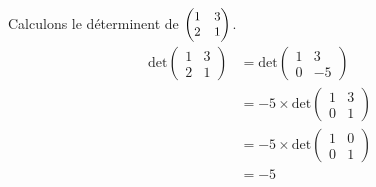 \documentclass[a4paper, titlepage]{article}
\begin{document}
	\begin{exemple}
		Calculons le déterminent de $\small\begin{pmatrix} 1&3\\2&1 \end{pmatrix}$.
		\begin{align*}
			\mathrm{det}\begin{pmatrix} 1&3\\2&1 \end{pmatrix} &= \mathrm{det}\begin{pmatrix} 1&3\\0&-5 \end{pmatrix}  \\
										 &= -5\times\mathrm{det}\begin{pmatrix} 1&3\\0&1 \end{pmatrix}  \\
										 &= -5\times\mathrm{det}\begin{pmatrix} 1&0\\0&1 \end{pmatrix}  \\
										 &= -5 
		\end{align*}
	\end{exemple}
\end{document}
